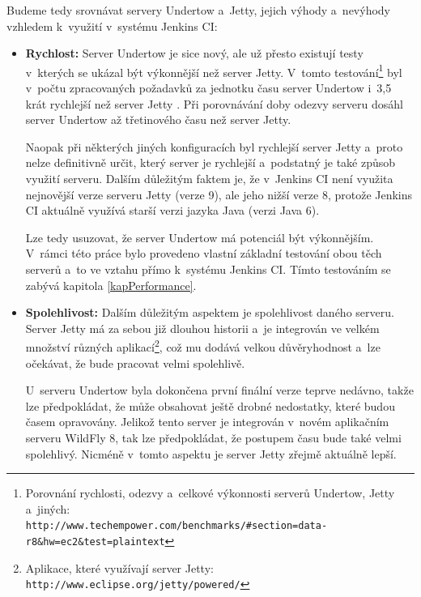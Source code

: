             \medskip
            Budeme tedy srovnávat servery Undertow a~Jetty, jejich výhody a~nevýhody
            vzhledem k~využití v~systému Jenkins CI:
            \begin{itemize}
                \item {\textbf{Rychlost:} Server Undertow je sice nový, ale už přesto existují
                    testy v~kterých se ukázal být výkonnější než server Jetty. V~tomto           
                    testování\footnote{Porovnání rychlosti, odezvy a~celkové výkonnosti serverů Undertow, Jetty a~jiných: 
                    \\\texttt{http://www.techempower.com/benchmarks/\#section=data-r8\&hw=ec2\&test=plaintext}}
                    byl v~počtu zpracovaných 
                    požadavků za jednotku času server Undertow i~3,5 krát rychlejší než server Jetty . Při porovnávání doby odezvy serveru 
                    dosáhl server Undertow až třetinového času než server Jetty. 
                    
                    Naopak při některých
                    jiných konfiguracích byl rychlejší server Jetty a~proto nelze definitivně určit,
                    který server je rychlejší a~podstatný je také způsob využití serveru. 
                    Dalším důležitým faktem je, že v~Jenkins CI není využita nejnovější verze serveru
                    Jetty (verze 9), ale jeho nižší verze 8, protože Jenkins CI aktuálně využívá
                    starší verzi jazyka Java (verzi Java 6).
                    
                    Lze tedy usuzovat, že server Undertow má potenciál být výkonnějším.
                    V~rámci této práce bylo provedeno vlastní základní testování 
                    obou těch serverů a~to ve vztahu přímo k~systému Jenkins CI. Tímto testováním
                    se zabývá kapitola \ref{kapPerformance}.
                    }

                \item{\textbf{Spolehlivost:} Dalším důležitým aspektem je spolehlivost daného serveru. 
                        Server Jetty má za sebou již dlouhou historii a~je integrován ve velkém množství
                        různých aplikací\footnote{Aplikace, které využívají server Jetty: \texttt{http://www.eclipse.org/jetty/powered/}},
                        což mu dodává velkou důvěryhodnost a~lze očekávat, že bude pracovat velmi 
                        spolehlivě. 
                        
                        U~serveru Undertow byla dokončena první finální verze teprve nedávno,
                        takže lze předpokládat, že může obsahovat ještě drobné nedostatky,
                        které budou časem opravovány. Jelikož tento server je integrován
                        v~novém aplikačním serveru WildFly 8, tak lze předpokládat,
                        že postupem času bude také velmi spolehlivý. 
                        Nicméně v~tomto aspektu je server Jetty zřejmě 
                        aktuálně lepší.}


\end{itemize}
